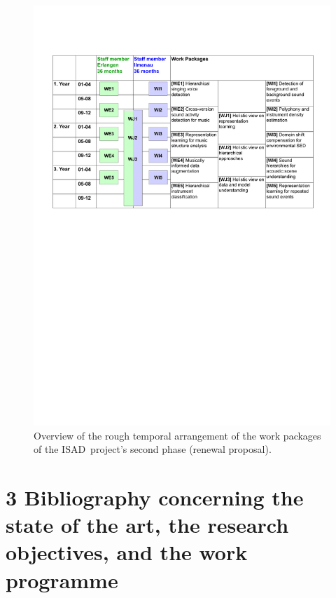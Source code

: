 \documentclass[11pt,a4paper]{article}
\def\PN{\mathrm{ISAD}}
\theoremstyle{plain} \newtheorem{define}{Definition}[section]
\begin{document}
{\begin{figure}[t]
\begin{center}
\includegraphics[width=13cm]{2021_MuellerAbesser_DFG-Antrag_ActDet_Timetable.pdf}
\end{center}
\vspace{-0.3cm}
\caption{
Overview of the rough temporal arrangement of the work packages of the $\PN$~project's second phase (renewal proposal). 
}
\label{figures:AP}
\end{figure}

\section*{3 Bibliography concerning the state of the art, the research objectives, and the work programme}

}
\end{document}
